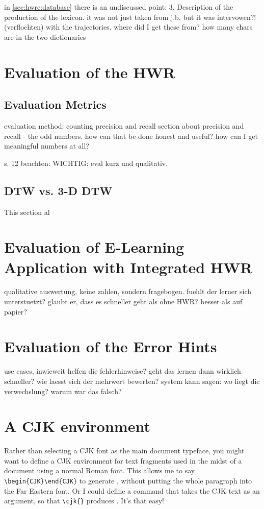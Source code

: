 in \ref{sec:hwre:database} there is an undiscussed point:
   3. Description of the production of the lexicon.
      it was not just taken from j.b. but it was intervowen?! (verflochten) 
      with the trajectories. where did I get these from? 
      how many chars are in the two dictionaries


\section{Evaluation of the HWR}
\subsection{ Evaluation Metrics }
evaluation method: counting precision and recall
section about precision and recall - the odd numbers.
how can that be done honest and useful?
how can I get meaningful numbers at all?

s. 12 beachten: WICHTIG: eval kurz und qualitativ.

\subsection{DTW vs. 3-D DTW}
\label{sec:impl:dtwvs3ddtw} %
This section al

\section{Evaluation of E-Learning Application with Integrated HWR}
qualitative auswertung, keine zahlen, sondern fragebogen.
fuehlt der lerner sich unterstuetzt? glaubt er, dass es schneller geht als ohne 
HWR? 
besser als auf papier?

\section{Evaluation of the Error Hints}
use cases, inwieweit helfen die fehlerhinweise?
geht das lernen dann wirklich schneller?
wie laesst sich der mehrwert bewerten?
system kann sagen: wo liegt die verwechslung? warum war das falsch?


\section{A CJK environment}

Rather than selecting a CJK font as the main document typeface, you might want to define a CJK environment for text fragments used in the midst of a document using a normal Roman font. This allows me to say 
\verb|\begin{CJK}|\verb|\end{CJK}| to generate , without putting the whole paragraph into the Far Eastern font. Or I could define a command that takes the CJK text as an argument, so that \verb|\cjk{|\verb|}| produces . It's that easy!


